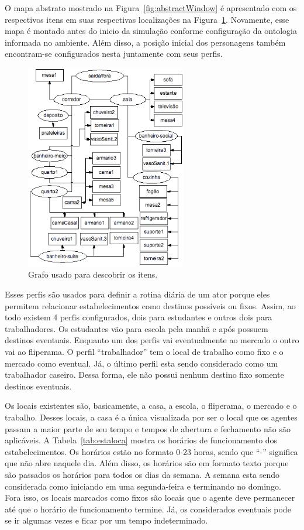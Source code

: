 O mapa abstrato mostrado na Figura~\ref{fig:abstractWindow} é apresentado
com os respectivos itens em suas respectivas localizações na
Figura~\ref{fig:abstractAnother}. Novamente, esse mapa é montado antes do
inicio da simulação conforme configuração da ontologia informada no
ambiente. Além disso, a posição inicial dos personagens também encontram-se
configurados nesta juntamente com seus perfis.

\begin{figure}
	\begin{center}
		\includegraphics[width=7cm]{figuras/abstract-comitens.png}
	\end{center}
	\caption{Grafo usado para descobrir os itens.}
	\label{fig:abstractAnother}
\end{figure}

Esses perfis são usados para definir a rotina diária de um ator porque eles
permitem relacionar estabelecimentos como destinos possíveis ou fixos.
Assim, ao todo existem 4 perfis configurados, dois para estudantes e
outros dois para trabalhadores. Os estudantes vão para escola pela manhã e
após possuem destinos eventuais. Enquanto um dos perfis vai eventualmente ao
mercado o outro vai ao fliperama. O perfil ``trabalhador'' tem o local de
trabalho como fixo e o mercado como eventual. Já, o último perfil esta sendo
considerado como um trabalhador caseiro. Dessa forma, ele não possui nenhum
destino fixo somente destinos eventuais.

Os locais existentes são, basicamente, a casa, a escola, o fliperama, o
mercado e o trabalho. Desses locais, a casa é a única visualizada por ser o
local que os agentes passam a maior parte de seu tempo e tempos de abertura e
fechamento não são aplicáveis. A Tabela~\ref{tab:estaloca} mostra os horários
de funcionamento dos estabelecimentos. Os horários estão no formato 0-23
horas, sendo que ``-'' significa que não abre naquele dia. Além disso, os
horários são em formato texto porque são passados os horários para todos os
dias da semana. A semana esta sendo considerada como iniciando em uma
segunda-feira e terminando no domingo. Fora isso, os locais marcados como
fixos são locais que o agente deve permanecer até que o horário de
funcionamento termine. Já, os considerados eventuais pode se ir algumas vezes
e ficar por um tempo indeterminado.

